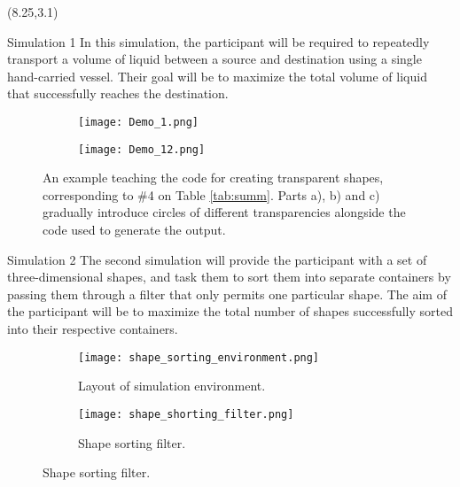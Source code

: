 \documentclass[22pt]{beamer}
\begin{document}
\begin{frame}[fragile]
\begin{textblock}{7.25}(8.25,3.1)

\begin{block}{Simulation 1}
In this simulation, the participant will be required to repeatedly transport a
volume of liquid between a source and destination using a single hand-carried
vessel. Their goal will be to maximize the total volume of liquid that successfully
reaches the destination.

\begin{figure}
  \begin{subfigure}[b]{0.34\textwidth}
    \texttt{[image: Demo\_1.png]}
    \caption{}
    \label{fig:1}
  \end{subfigure}
  \begin{subfigure}[b]{0.339\textwidth}
    \texttt{[image: Demo\_12.png]}
    \caption{}
    \label{fig:2}
  \end{subfigure}

      \caption{An example teaching the code for creating transparent shapes, corresponding to \#4 on Table \ref{tab:summ}. Parts a), b) and c) gradually introduce circles of different transparencies alongside the code used to generate the output.}
\end{figure}




\begin{comment}
\texttt{[image: Demo\_1.png]}. 
\texttt{[image: Demo1mid.png]}. 
\texttt{[image: Demo\_12.png]}\newline. %
\end{comment}



\end{block}
\begin{block}{Simulation 2}
The second simulation will provide the participant with a set of three-dimensional
shapes, and task them to sort them into separate containers by passing them
through a filter that only permits one particular shape. The aim of the participant
will be to maximize the total number of shapes successfully sorted into
their respective containers.
\begin{figure}
  \begin{subfigure}[b]{0.40\textwidth}
    \texttt{[image: shape\_sorting\_environment.png]}
        \caption{Layout of simulation environment.}
  \end{subfigure}
  \begin{subfigure}[b]{0.40\textwidth}
    \texttt{[image: shape\_shorting\_filter.png]}
        \caption{Shape sorting filter.}
    \end{subfigure}
 \end{figure}
\end{block}



\end{textblock}
\end{frame}
\end{document}
